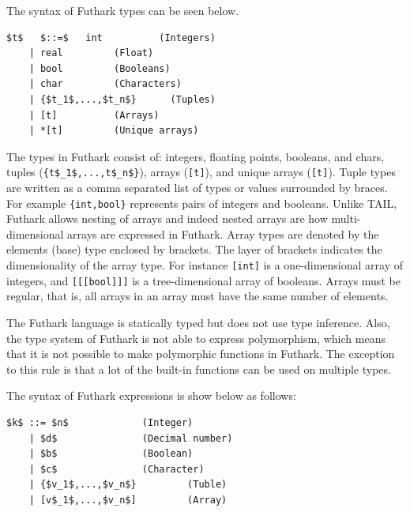 \documentclass[11pt]{article}
\begin{document}
The syntax of Futhark types can be seen below.
\begin{lstlisting}[numbers=none,frame=none]
$t$   $::=$   int          (Integers)
    | real         (Float)
    | bool         (Booleans)
    | char         (Characters)
    | {$t_1$,...,$t_n$}      (Tuples)
    | [t]          (Arrays)
    | *[t]         (Unique arrays)
\end{lstlisting}
The types in Futhark consist of: integers, floating points, booleans, and chars, tuples (\lstinline |{t$_1$,...,t$_n$}|), arrays ({\tt [t]}), and unique arrays ({\tt *[t]}).
Tuple types are written as a comma separated list of types or values surrounded by braces.
For example \lstinline|{int,bool}| represents pairs of integers and booleans.
Unlike TAIL, Futhark allows nesting of arrays and indeed nested arrays are how multi-dimensional arrays are expressed in Futhark.
Array types are denoted by the elements (base) type enclosed by brackets.
The layer of brackets indicates the dimensionality of the array type.
For instance {\tt [int]} is a one-dimensional array of integers, and {\tt [[[bool]]]} is a tree-dimensional array of booleans.
Arrays must be regular, that is, all arrays in an array must have the same number of elements.

The Futhark language is statically typed but does not use type inference.
Also, the type system of Futhark is not able to express polymorphism, which means that it is not possible to make polymorphic functions in Futhark.
The exception to this rule is that a lot of the built-in functions can be used on multiple types.

The syntax of Futhark expressions is show below as follows:
\begin{lstlisting}[numbers=none,frame=none]
$k$ ::= $n$				(Integer)
    | $d$				(Decimal number)
    | $b$				(Boolean) 		
    | $c$ 				(Character)
    | {$v_1$,...,$v_n$} 		(Tuble)
    | [v$_1$,...,$v_n$] 		(Array)
\end{lstlisting}
\end{document}
